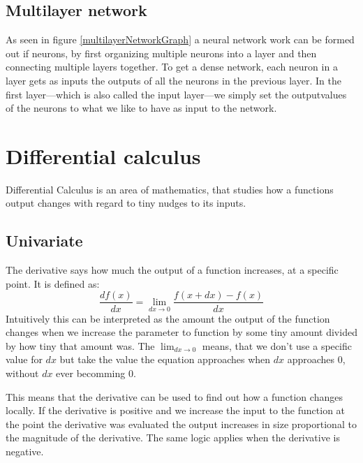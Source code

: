 \subsection{Multilayer network}
As seen in figure \ref{multilayerNetworkGraph} a neural network work can be formed out if neurons, by first organizing multiple neurons into a layer and then connecting multiple layers together. To get a dense network, each neuron in a layer gets as inputs the outputs of all the neurons in the previous layer. In the first layer---which is also called the input layer---we simply set the outputvalues of the neurons to what we like to have as input to the network.

\vspace*{\fill}


\section{Differential calculus}
Differential Calculus is an area of mathematics, that studies how a functions output changes with regard to tiny nudges to its inputs.

\subsection{Univariate}
The derivative says how much the output of a function increases, at a specific point. It is defined as:
\begin{equation}
	\frac{df(x)}{dx} = \lim_{dx \to 0}\frac{f(x + dx) - f(x)}{dx}
\end{equation}
Intuitively this can be interpreted as the amount the output of the function changes when we increase the parameter to function by some tiny amount divided by how tiny that amount was. The $\lim_{dx \to 0}$ means, that we don't use a specific value for $dx$ but take the value the equation approaches when $dx$ approaches $0$, without $dx$ ever becomming $0$.

This means that the derivative can be used to find out how a function changes locally. If the derivative is positive and we increase the input to the function at the point the derivative was evaluated the output increases in size proportional to the magnitude of the derivative. The same logic applies when the derivative is negative.

